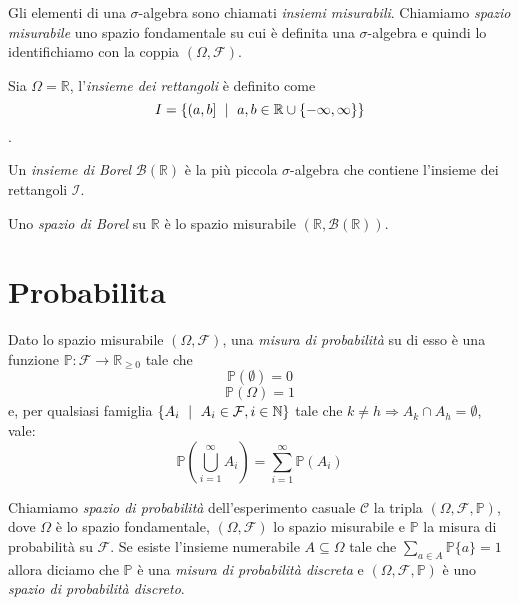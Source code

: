 Gli elementi di una $\sigma$-algebra sono chiamati \emph{insiemi misurabili}. Chiamiamo \emph{spazio misurabile} uno spazio fondamentale su cui è definita una $\sigma$-algebra e quindi lo identifichiamo con la coppia $(\Omega, \mathcal{F})$.

\begin{mtdef}
	Sia $\Omega=\mathbb{R}$, l'\emph{insieme dei rettangoli} è definito come $$ I = \{(a,b] \mbox{ }\mid\mbox{ } a,b\in \mathbb{R} \cup \{-\infty,\infty\}\} $$.
\end{mtdef}

\begin{mtdef}
	Un \emph{insieme di Borel} $\mathcal{B}(\mathbb{R})$ è la più piccola $\sigma$-algebra che contiene l'insieme dei rettangoli $\mathcal{I}$.
\end{mtdef}

\begin{mtdef}
	Uno \emph{spazio di Borel} su $\mathbb{R}$ è lo spazio misurabile $(\mathbb{R},\mathcal{B}(\mathbb{R}))$.
\end{mtdef}

\section{Probabilita}

\begin{mtdef}
	Dato lo spazio misurabile $(\Omega,\mathcal{F})$, una \emph{misura di probabilità} su di esso è una funzione $\mathbb{P} : \mathcal{F} \rightarrow \mathbb{R}_{\geq 0}$ tale che
	\begin{equation}
		\mathbb{P}(\emptyset) = 0
	\end{equation}
	\begin{equation}
		\mathbb{P}(\Omega) = 1
	\end{equation}
	e, per qualsiasi famiglia $\{A_i \mbox{ }\mid\mbox{ } A_i \in \mathcal{F}, i \in \mathbb{N}\}$ tale che $k \neq h \Rightarrow A_k \cap A_h = \emptyset$, vale:
	\begin{equation}
		 \mathbb{P}\left(\bigcup_{i=1}^\infty A_i\right) = \sum_{i=1}^\infty \mathbb{P}\left(A_i\right)
	\end{equation}
\end{mtdef}

Chiamiamo \emph{spazio di probabilità} dell'esperimento casuale $\mathcal{C}$ la tripla $(\Omega, \mathcal{F}, \mathbb{P})$, dove $\Omega$ è lo spazio fondamentale, $(\Omega, \mathcal{F})$ lo spazio misurabile e $\mathbb{P}$ la misura di probabilità su $\mathcal{F}$.
Se esiste l'insieme numerabile $A \subseteq \Omega$ tale che $\sum_{a \in A} \mathbb{P}\{a\} = 1$ allora diciamo che $\mathbb{P}$ è una \emph{misura di probabilità discreta} e $(\Omega, \mathcal{F}, \mathbb{P})$ è uno \emph{spazio di probabilità discreto}.

